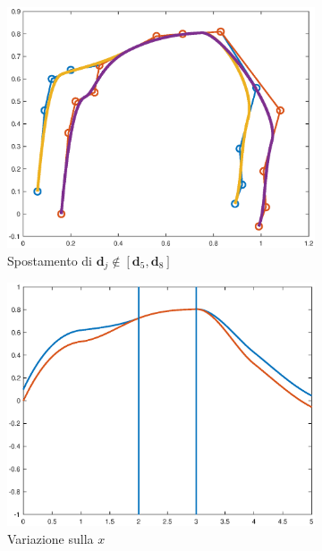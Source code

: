 \documentclass[a4paper, 10pt]{article}
\begin{document}
\begin{figure}[]
  \centering
  \begin{subfigure}[b]{0.3\textwidth}
    \includegraphics[width=\textwidth]{figure/loc6.eps}
    \caption{Spostamento di $\mathbf{d}_j \notin [\mathbf{d}_{5}, \mathbf{d}_{8}]$ }
    \label{fig:loc6}
  \end{subfigure}
  \begin{subfigure}[b]{0.3\textwidth}
      \includegraphics[width=\textwidth]{figure/loc5.eps}
      \caption{Variazione sulla $x$}
      \label{fig:loc5}
  \end{subfigure}
  \begin{subfigure}[b]{0.3\textwidth}

\end{subfigure}
\end{figure}
\end{document}

